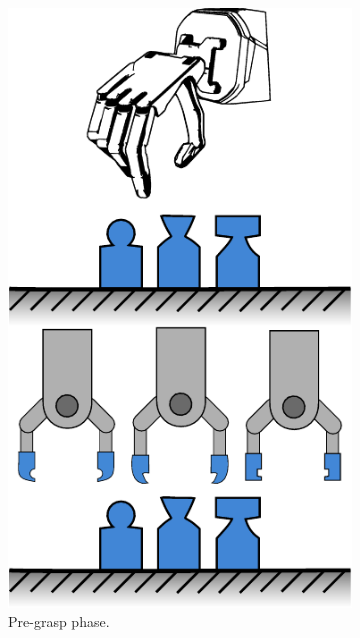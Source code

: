 \begin{figure}[h]
	\centering
	\begin{subfigure}[b]{0.24\textwidth}
		\centering
		\includegraphics[width=\textwidth]{chapters/introduction/fig/pipeline-1.pdf}
		\caption{Pre-grasp phase.}
		\label{fig:pre-grasp-phase}
	\end{subfigure}
	\hfill
	\begin{subfigure}[b]{0.24\textwidth}
		\centering

\end{subfigure}
\end{figure}

